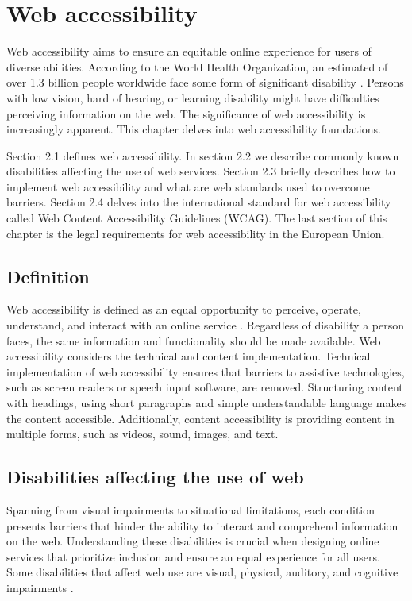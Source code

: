\chapter{Web accessibility\label{accessibility}}

Web accessibility aims to ensure an equitable online experience for users of diverse abilities. According to the World Health Organization, an estimated of over 1.3 billion people worldwide face some form of significant disability \citep{whodisability}. Persons with low vision, hard of hearing, or learning disability might have difficulties perceiving information on the web. The significance of web accessibility is increasingly apparent. This chapter delves into web accessibility foundations. 

Section 2.1 defines web accessibility. In section 2.2 we describe commonly known disabilities affecting the use of web services. Section 2.3 briefly describes how to implement web accessibility and what are web standards used to overcome barriers. Section 2.4 delves into the international standard for web accessibility called Web Content Accessibility Guidelines (WCAG). The last section of this chapter is the legal requirements for web accessibility in the European Union.

\section{Definition}

Web accessibility is defined as an equal opportunity to perceive, operate, understand, and interact with an online service \citep{webaccessibilitydefinition}. Regardless of disability a person faces, the same information and functionality should be made available. Web accessibility considers the technical and content implementation. Technical implementation of web accessibility ensures that barriers to assistive technologies, such as screen readers or speech input software, are removed. Structuring content with headings, using short paragraphs and simple understandable language makes the content accessible. Additionally, content accessibility is providing content in multiple forms, such as videos, sound, images, and text.

\section{Disabilities affecting the use of web}

Spanning from visual impairments to situational limitations, each condition presents barriers that hinder the ability to interact and comprehend information on the web. Understanding these disabilities is crucial when designing online services that prioritize inclusion and ensure an equal experience for all users. Some disabilities that affect web use are visual, physical, auditory, and cognitive impairments \citep{w3cbarriers}.

